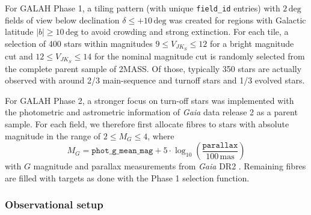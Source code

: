 \documentclass[
  journal=pasa,
  manuscript=research-paper, %
  year=2024,
  volume=37
]{cup-journal}
\newcommand{\Gaia}{\textit{Gaia}\xspace}
\begin{document}
For GALAH Phase 1, a tiling pattern (with unique \texttt{field\_id} entries) with $2\,\mathrm{deg}$ fields of view below declination $\delta \leq +10\,\mathrm{deg}$ was created for regions with Galactic latitude $\vert b \vert \geq 10\,\mathrm{deg}$ to avoid crowding and strong extinction. For each tile, a selection of 400 stars within magnitudes $9 \leq V_{JK_S} \leq 12$ for a bright magnitude cut and $12 \leq V_{JK_S} \leq 14$ for the nominal magnitude cut is randomly selected from the complete parent sample of 2MASS. Of those, typically 350 stars are actually observed with around 2/3 main-sequence and turnoff stars and 1/3 evolved stars.

For GALAH Phase 2, a stronger focus on turn-off stars was implemented with the photometric and astrometric information of \Gaia data release 2 as a parent sample. For each field, we therefore first allocate fibres to stars with absolute magnitude in the range of $2 \leq M_G \leq 4$, where
\begin{equation}
M_G = \texttt{phot\_g\_mean\_mag} + 5 \cdot \log_{10} \left( \frac{\texttt{parallax}}{100\,\mathrm{mas}} \right)
\end{equation}
with $G$ magnitude and parallax measurements from \Gaia DR2 \citep{Brown2018, Evans2018, Lindegren2018}. Remaining fibres are filled with targets as done with the Phase 1 selection function.

\subsubsection{Observational setup}
\end{document}
